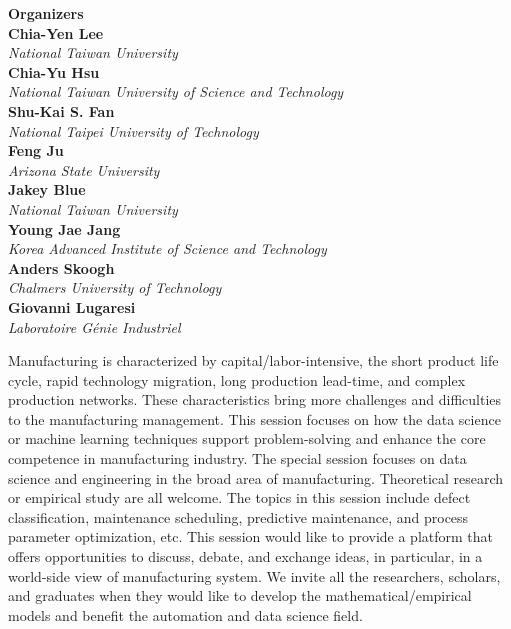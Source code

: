 \large \textbf{Organizers} \normalsize \vspace{2mm} \\
\textbf{Chia-Yen  Lee} \\ 
\textit{National Taiwan University} \vspace{{2mm}} \\
\textbf{Chia-Yu  Hsu} \\ 
\textit{National Taiwan University of Science and Technology} \vspace{{2mm}} \\
\textbf{Shu-Kai S.  Fan} \\ 
\textit{National Taipei University of Technology} \vspace{{2mm}} \\
\textbf{Feng  Ju} \\ 
\textit{Arizona State University} \vspace{{2mm}} \\
\textbf{Jakey  Blue} \\ 
\textit{National Taiwan University} \vspace{{2mm}} \\
\textbf{Young Jae  Jang} \\ 
\textit{Korea Advanced Institute of Science and Technology} \vspace{{2mm}} \\
\textbf{Anders  Skoogh} \\ 
\textit{Chalmers University of Technology} \vspace{{2mm}} \\
\textbf{Giovanni  Lugaresi} \\ 
\textit{Laboratoire Génie Industriel}

Manufacturing is characterized by capital/labor-intensive, the short product life cycle, rapid technology migration, long production lead-time, and complex production networks. These characteristics bring more challenges and difficulties to the manufacturing management. This session focuses on how the data science or machine learning techniques support problem-solving and enhance the core competence in manufacturing industry. The special session focuses on data science and engineering in the broad area of manufacturing. Theoretical research or empirical study are all welcome. The topics in this session include defect classification, maintenance scheduling, predictive maintenance, and process parameter optimization, etc.  This session would like to provide a platform that offers opportunities to discuss, debate, and exchange ideas, in particular, in a world-side view of manufacturing system. We invite all the researchers, scholars, and graduates when they would like to develop the mathematical/empirical models and benefit the automation and data science field. 

